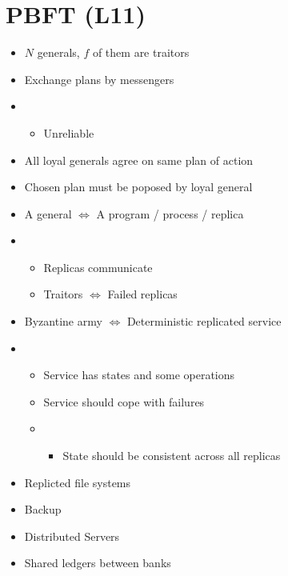 \documentclass{easyclass}
\begin{document}
\chapter{PBFT (L11)}
\begin{theo}{}
    \begin{itemize}
        \item $N$ generals, $f$ of them are traitors
        \item Exchange plans by messengers
        \item \begin{itemize}
            \item Unreliable %
        \end{itemize}
        \item All loyal generals agree on same plan of action
        \item Chosen plan must be poposed by loyal general
    \end{itemize}
\end{theo}


\begin{lem}{}
    \begin{itemize}
        \item A general $\Leftrightarrow$ A program / process / replica
        \item \begin{itemize}
            \item Replicas communicate
            \item Traitors $\Leftrightarrow$ Failed replicas
        \end{itemize}
        \item Byzantine army $\Leftrightarrow$ Deterministic replicated service
        \item \begin{itemize}
            \item Service has states and some operations
            \item Service should cope with failures
            \item \begin{itemize}
                \item State should be consistent across all replicas
            \end{itemize}
        \end{itemize}
    \end{itemize}
\end{lem}
\begin{prf}[Applications]{}
    \begin{itemize}
        \item Replicted file systems
        \item Backup
        \item Distributed Servers
        \item Shared ledgers between banks
    \end{itemize}
\end{prf}
\end{document}
